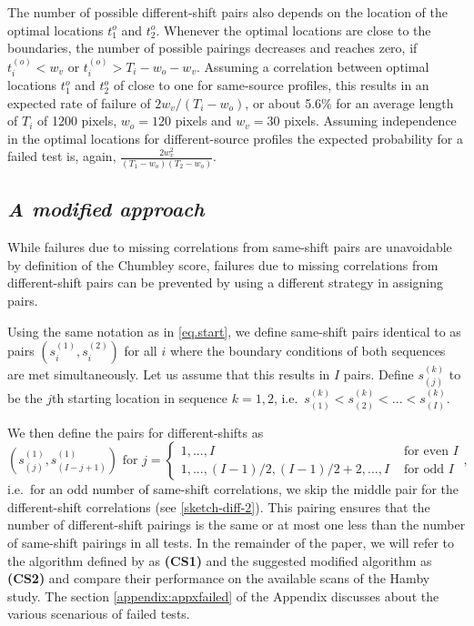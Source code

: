 \documentclass[12pt]{article}
\begin{document}
The number of possible different-shift pairs also depends on the
location of the optimal locations \(t_1^o\) and \(t_2^o\). Whenever the
optimal locations are close to the boundaries, the number of possible
pairings decreases and reaches zero, if \(t_i^{(o)} < w_v\) or
\(t_i^{(o)} > T_i-w_o- w_v\). Assuming a correlation between optimal
locations \(t_1^o\) and \(t_2^o\) of close to one for same-source
profiles, this results in an expected rate of failure of
\(2 w_v / (T_i-w_o)\), or about 5.6\% for an average length of \(T_i\)
of 1200 pixels, \(w_o = 120\) pixels and \(w_v = 30\) pixels. Assuming
independence in the optimal locations for different-source profiles the
expected probability for a failed test is, again,
\(\frac{2 w_v^2}{(T_1-w_o)(T_2-w_o)}\).

\hypertarget{a-modified-approach}{%
\subsection*{\texorpdfstring{\emph{A modified
approach}}{A modified approach}}\label{a-modified-approach}}

While failures due to missing correlations from same-shift pairs are
unavoidable by definition of the Chumbley score, failures due to missing
correlations from different-shift pairs can be prevented by using a
different strategy in assigning pairs.

Using the same notation as in \autoref{eq.start}, we define same-shift
pairs identical to \citet{hadler} as pairs \((s_i^{(1)}, s_i^{(2)})\)
for all \(i\) where the boundary conditions of both sequences are met
simultaneously. Let us assume that this results in \(I\) pairs. Define
\(s_{(j)}^{(k)}\) to be the \(j\)th starting location in sequence
\(k = 1, 2\),
i.e.~\(s_{(1)}^{(k)} < s_{(2)}^{(k)} < ... < s_{(I)}^{(k)}\).

We then define the pairs for different-shifts as
\begin{equation}\label{eq.diff2}
\left(s_{(j)}^{(1)}, s_{(I-j+1)}^{(1)} \right) \text{ for } j = 
\begin{cases}
1, ..., I & \text{ for even } I \\
1, ..., (I-1)/2, (I-1)/2 + 2, ..., I & \text{ for odd } I
\end{cases},
\end{equation} i.e.~for an odd number of same-shift correlations, we
skip the middle pair for the different-shift correlations (see
\autoref{sketch-diff-2}). This pairing ensures that the number of
different-shift pairings is the same or at most one less than the number
of same-shift pairings in all tests. In the remainder of the paper, we
will refer to the algorithm defined by \citet{hadler} as \textbf{(CS1)}
and the suggested modified algorithm as \textbf{(CS2)} and compare their
performance on the available scans of the Hamby study. The section
\ref{appendix:appxfailed} of the Appendix discusses about the various
scenarious of failed tests.
\end{document}
